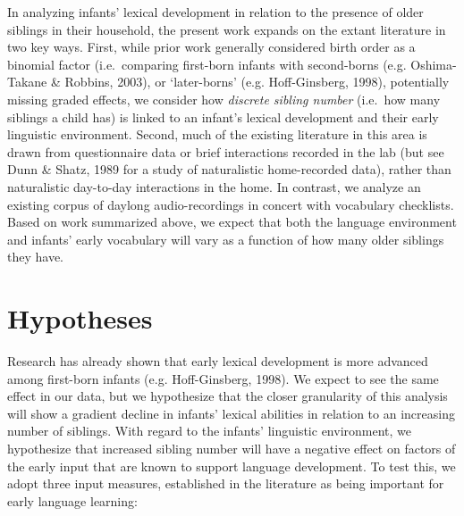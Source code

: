\documentclass[
  english,
  man,floatsintext]{apa6}
\begin{document}
In analyzing infants' lexical development in relation to the presence of older siblings in their household, the present work expands on the extant literature in two key ways. First, while prior work generally considered birth order as a binomial factor (i.e.~comparing first-born infants with second-borns (e.g. Oshima-Takane \& Robbins, 2003), or `later-borns' (e.g. Hoff-Ginsberg, 1998), potentially missing graded effects, we consider how \emph{discrete sibling number} (i.e.~how many siblings a child has) is linked to an infant's lexical development and their early linguistic environment. Second, much of the existing literature in this area is drawn from questionnaire data or brief interactions recorded in the lab (but see Dunn \& Shatz, 1989 for a study of naturalistic home-recorded data), rather than naturalistic day-to-day interactions in the home. In contrast, we analyze an existing corpus of daylong audio-recordings in concert with vocabulary checklists. Based on work summarized above, we expect that both the language environment and infants' early vocabulary will vary as a function of how many older siblings they have.

\hypertarget{hypotheses}{%
\section{Hypotheses}\label{hypotheses}}

Research has already shown that early lexical development is more advanced among first-born infants (e.g. Hoff-Ginsberg, 1998). We expect to see the same effect in our data, but we hypothesize that the closer granularity of this analysis will show a gradient decline in infants' lexical abilities in relation to an increasing number of siblings.
With regard to the infants' linguistic environment, we hypothesize that increased sibling number will have a negative effect on factors of the early input that are known to support language development. To test this, we adopt three input measures, established in the literature as being important for early language learning:
\end{document}
